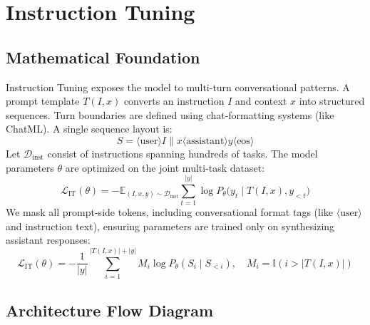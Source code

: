 \newpage
\section{Instruction Tuning}

\subsection{Mathematical Foundation}
Instruction Tuning exposes the model to multi-turn conversational patterns. A prompt template $T(I, x)$ converts an instruction $I$ and context $x$ into structured sequences. Turn boundaries are defined using chat-formatting systems (like ChatML). A single sequence layout is:
\begin{equation}
  S = \langle\text{user}\rangle I \parallel x \langle\text{assistant}\rangle y \langle\text{eos}\rangle
\end{equation}
Let $\mathcal{D}_{\text{inst}}$ consist of instructions spanning hundreds of tasks. The model parameters $\theta$ are optimized on the joint multi-task dataset:
\begin{equation}
  \mathcal{L}_{\text{IT}}(\theta) = -\mathbb{E}_{(I, x, y) \sim \mathcal{D}_{\text{inst}}} \sum_{t=1}^{|y|} \log P_\theta\bigl(y_t \mid T(I, x), y_{<t}\bigr)
\end{equation}
We mask all prompt-side tokens, including conversational format tags (like $\langle\text{user}\rangle$ and instruction text), ensuring parameters are trained only on synthesizing assistant responses:
\begin{equation}
  \mathcal{L}_{\text{IT}}(\theta) = -\frac{1}{|y|} \sum_{i=1}^{|T(I,x)|+|y|} M_i \log P_\theta(S_i \mid S_{<i}), \quad M_i = \mathbb{I}(i > |T(I, x)|)
\end{equation}

\subsection{Architecture Flow Diagram}

